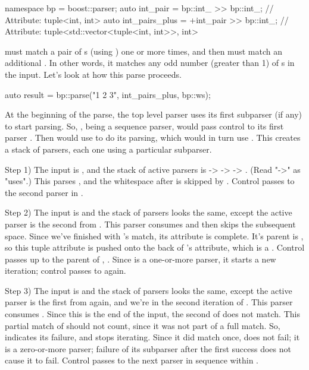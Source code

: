 \documentclass{MyBook}
\begin{document}
\begin{code}
namespace bp = boost::parser;
auto int_pair = bp::int_ >> bp::int_;         // Attribute: tuple<int, int>
auto int_pairs_plus = +int_pair >> bp::int_;  // Attribute: tuple<std::vector<tuple<int, int>>, int>
\end{code}

 must match a pair of s (using ) one or more times, and then must match an additional . In other words, it matches any odd number (greater than 1) of s in the input. Let's look at how this parse proceeds.

\begin{code}
auto result = bp::parse("1 2 3", int_pairs_plus, bp::ws);
\end{code}

At the beginning of the parse, the top level parser uses its first subparser (if any) to start parsing. So, , being a sequence parser, would pass control to its first parser . Then  would use  to do its parsing, which would in turn use . This creates a stack of parsers, each one using a particular subparser.

Step 1) The input is , and the stack of active parsers is  ->  ->  -> . (Read "-\textgreater" as "uses".) This parses , and the whitespace after is skipped by . Control passes to the second  parser in .

Step 2) The input is  and the stack of parsers looks the same, except the active parser is the second  from . This parser consumes  and then  skips the subsequent space. Since we've finished with 's match, its  attribute is complete. It's parent is , so this tuple attribute is pushed onto the back of 's attribute, which is a . Control passes up to the parent of , . Since  is a one-or-more parser, it starts a new iteration; control passes to  again.

Step 3) The input is  and the stack of parsers looks the same, except the active parser is the first  from  again, and we're in the second iteration of . This parser consumes . Since this is the end of the input, the second  of  does not match. This partial match of  should not count, since it was not part of a full match. So,  indicates its failure, and  stops iterating. Since it did match once,  does not fail; it is a zero-or-more parser; failure of its subparser after the first success does not cause it to fail. Control passes to the next parser in sequence within .
\end{document}
